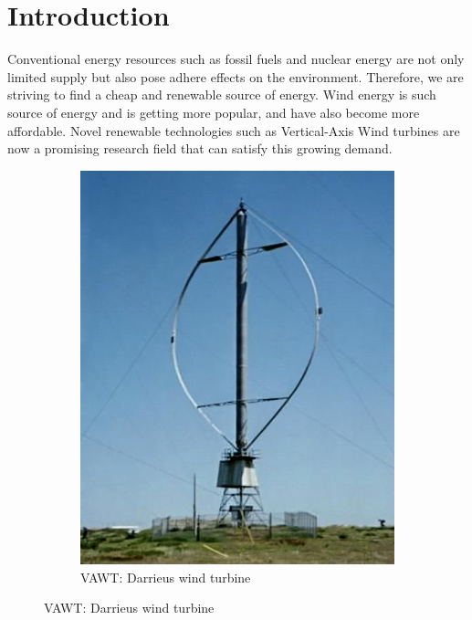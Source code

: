 \chapter{Introduction}
\label{ch:Introduction}
Conventional energy resources such as fossil fuels and nuclear energy are not only limited supply but also pose adhere effects on the environment. Therefore, we are striving to find a cheap and renewable source of energy. Wind energy is such source of energy and is getting more popular, and have also become more affordable. Novel renewable technologies such as Vertical-Axis Wind turbines are now a promising research field that can satisfy this growing demand.

	\begin{figure}[!b]
        \centering
        \begin{subfigure}[b]{0.25\textwidth}
                \includegraphics[height=0.2\textheight]{figures/introduction/Darrieus-windmill.jpg}
                \caption{VAWT: Darrieus wind turbine\cite{darrieusWindmill}}
                \label{fig:Darrieus-windmill}
        \end{subfigure}%
        \qquad \qquad%

\end{figure}
